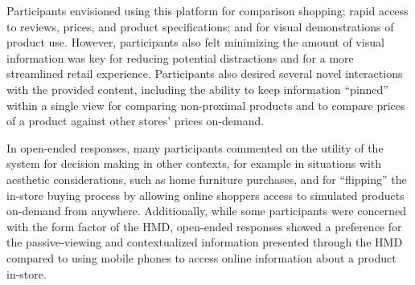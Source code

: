 Participants envisioned using this platform for comparison shopping; rapid access to reviews, prices, and product specifications; and for visual demonstrations of product use. However, participants also felt minimizing the amount of visual information was key for reducing potential distractions and for a more streamlined retail experience. 
Participants also desired several novel interactions with the provided content, including the ability to keep information ``pinned'' within a single view for comparing non-proximal products and to compare prices of a product against other stores' prices on-demand. 

In open-ended responses, many participants commented on the utility of the system for decision making in other contexts, for example in situations with aesthetic considerations, such as home furniture purchases, and for ``flipping'' the in-store buying process by allowing online shoppers access to simulated products on-demand from anywhere. Additionally, while some participants were concerned with the form factor of the HMD, open-ended responses showed a preference for the passive-viewing and contextualized information presented through the HMD compared to using mobile phones to access online information about a product in-store. 


